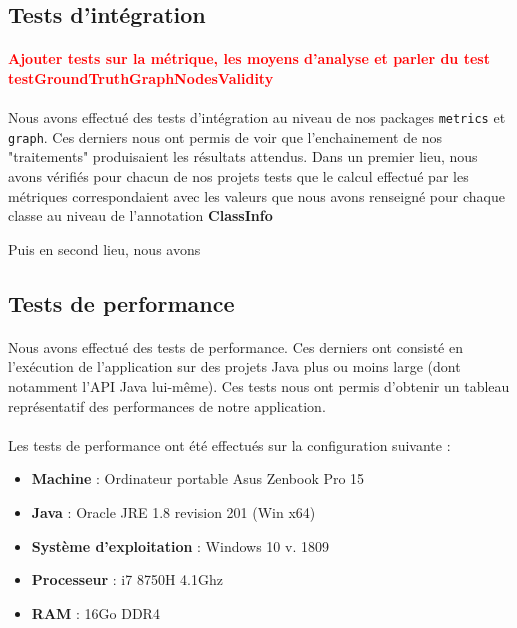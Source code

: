 \documentclass{scrartcl}
\newcommand{\TODO}[1] {
    \noindent \paragraph{\textcolor{red}{#1}}
}
\begin{document}
\subsection{Tests d'intégration}
    \TODO{Ajouter tests sur la métrique, les moyens d'analyse et parler du test testGroundTruthGraphNodesValidity }
    \paragraph{}Nous avons effectué des tests d'intégration au niveau de nos packages \texttt{metrics} et \texttt{graph}. Ces derniers nous ont permis de voir que l'enchainement de nos "traitements" produisaient les résultats attendus. Dans un premier lieu, nous avons vérifiés pour chacun de nos projets tests que le calcul effectué par les métriques correspondaient avec les valeurs que nous avons renseigné pour chaque classe au niveau de l'annotation \textbf{ClassInfo}
    
    Puis en second lieu, nous avons 

\subsection{Tests de performance}

    \paragraph{}Nous avons effectué des tests de performance. Ces derniers ont consisté en l’exécution de l’application sur des projets Java plus ou moins large (dont notamment l'API Java lui-même). Ces tests nous ont permis d’obtenir un tableau représentatif des performances de notre application.

    \paragraph{}Les tests de performance ont été effectués sur la configuration suivante :
    \begin{itemize}
        \item \textbf{Machine} : Ordinateur portable Asus Zenbook Pro 15
        \item \textbf{Java} : Oracle JRE 1.8 revision 201 (Win x64)
        \item \textbf{Système d'exploitation} : Windows 10 v. 1809
        \item \textbf{Processeur} : i7 8750H 4.1Ghz
        \item \textbf{RAM} : 16Go DDR4
    \end{itemize}
    
\end{document}
